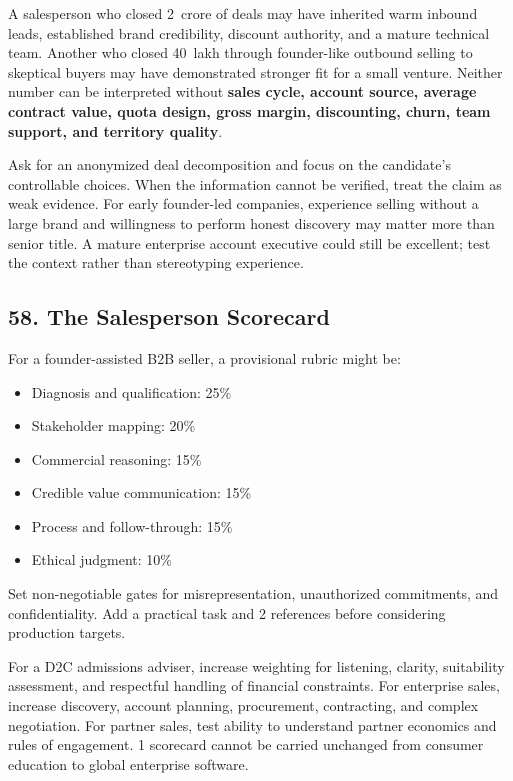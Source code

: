 A salesperson who closed 2~crore of deals may have inherited warm inbound leads, established brand credibility, discount authority, and a mature technical team. Another who closed 40~lakh through founder-like outbound selling to skeptical buyers may have demonstrated stronger fit for a small venture. Neither number can be interpreted without \textbf{sales cycle, account source, average contract value, quota design, gross margin, discounting, churn, team support, and territory quality}.

Ask for an anonymized deal decomposition and focus on the candidate's controllable choices. When the information cannot be verified, treat the claim as weak evidence. For early founder-led companies, experience selling without a large brand and willingness to perform honest discovery may matter more than senior title. A mature enterprise account executive could still be excellent; test the context rather than stereotyping experience.

\subsection*{58. The Salesperson Scorecard}

For a founder-assisted B2B seller, a provisional rubric might be:
\begin{itemize}[leftmargin=*]
\item Diagnosis and qualification: 25\%
\item Stakeholder mapping: 20\%
\item Commercial reasoning: 15\%
\item Credible value communication: 15\%
\item Process and follow-through: 15\%
\item Ethical judgment: 10\%
\end{itemize}
Set non-negotiable gates for misrepresentation, unauthorized commitments, and confidentiality. Add a practical task and 2 references before considering production targets.

For a D2C admissions adviser, increase weighting for listening, clarity, suitability assessment, and respectful handling of financial constraints. For enterprise sales, increase discovery, account planning, procurement, contracting, and complex negotiation. For partner sales, test ability to understand partner economics and rules of engagement. 1 scorecard cannot be carried unchanged from consumer education to global enterprise software.

